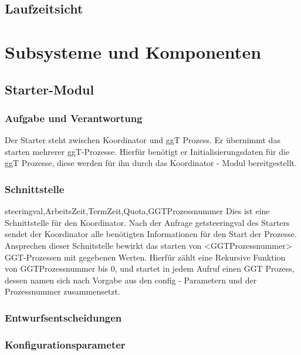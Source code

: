 \documentclass{article}
\begin{document}
\subsection{Laufzeitsicht}

\newpage

\section{Subsysteme und Komponenten}

\subsection{Starter-Modul}
\subsubsection{Aufgabe und Verantwortung}

Der Starter steht zwischen Koordinator und ggT Prozess. Er übernimmt das starten mehrerer ggT-Prozesse.
Hierfür benötigt er Initialisierungsdaten für die ggT Prozesse, diese werden für ihn durch das Koordinator - Modul
bereitgestellt.


\subsubsection{Schnittstelle}
{steeringval,ArbeitsZeit,TermZeit,Quota,GGTProzessnummer}
Dies ist eine Schnittstelle für den Koordinator. Nach der Anfrage getsteeringval des Starters sendet der Koordinator alle
benötigten Informationen für den Start der Prozesse. Ansprechen dieser Schnitstelle bewirkt das starten von <GGTProzessnummer>
GGT-Prozessen mit gegebenen Werten.
Hierfür zählt eine Rekursive Funktion von GGTProzessnummer bis 0, und startet in jedem Aufruf einen GGT Prozess,
dessen namen sich nach Vorgabe aus den config - Parametern und der Prozessnummer zusammensetzt.

\subsubsection{Entwurfsentscheidungen}

\subsubsection{Konfigurationsparameter}

\newpage
\end{document}
